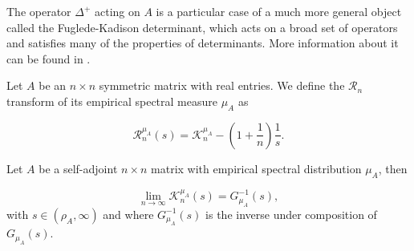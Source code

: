 The operator $\Delta^+$ acting on $A$ is a particular case of a much more general object called the Fuglede-Kadison determinant, which acts on a broad set of operators and satisfies many of the properties of determinants. More information about it can be found in \cite{article:fuglede_kadisen_determinant}.


\begin{definition}
    Let $A$ be an $n\times n$ symmetric matrix with real entries. We define the $\mathcal R_n$ transform of its empirical spectral measure $\mu_A$ as 

    \begin{equation*}
        \mathcal R_n^{\mu_A} (s) = \mathcal K_n^{\mu_A} - \left( 1 + \frac1n \right) \frac1s.
    \end{equation*}
\end{definition}

\begin{theorem} Let $A$ be a self-adjoint $n \times n$ matrix with empirical spectral distribution $\mu_A$, then

    \begin{equation*}
        \lim_{n\to\infty} \mathcal K_n^{\mu_A} (s) = G_{\mu_A}^{-1}(s),
    \end{equation*}
\noindent with $s \in (\rho_A, \infty)$ and where $G_{\mu_A}^{-1}(s)$ is the inverse under composition of $G_{\mu_A}(s)$.
\end{theorem}

